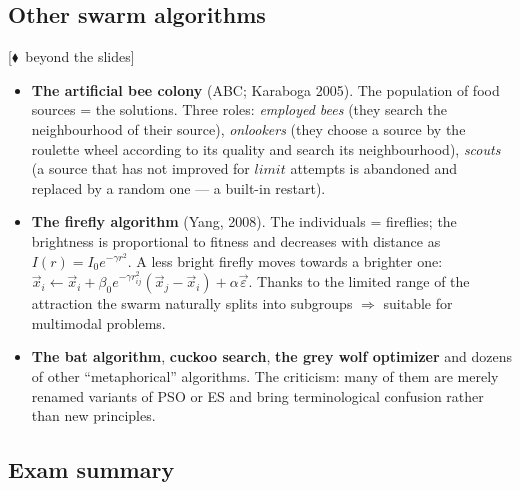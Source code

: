 \documentclass[11pt,a4paper]{article}
\theoremstyle{definition}
\providecommand{\uv}[1]{``#1''}
\newcommand{\mimo}{\textcolor{markcol}{\textsf{\footnotesize[$\blacklozenge$~beyond the slides]}}}
\begin{document}
\subsection{Other swarm algorithms}

\noindent\mimo{}

\begin{itemize}
\item \textbf{The artificial bee colony} (ABC; Karaboga 2005). The population of
  food sources = the solutions. Three roles:
  \emph{employed bees} (they search the neighbourhood of their source),
  \emph{onlookers} (they choose a source by the roulette wheel according to its
  quality and search its neighbourhood),
  \emph{scouts} (a source that has not improved for $limit$ attempts is
  abandoned and replaced by a random one --- a built-in restart).
\item \textbf{The firefly algorithm} (Yang, 2008). The individuals = fireflies;
  the brightness is proportional to fitness and decreases with distance as
  $I(r) = I_0 e^{-\gamma r^2}$. A less bright firefly moves towards a brighter
  one:
  $\vec x_i \gets \vec x_i + \beta_0 e^{-\gamma r_{ij}^2}(\vec x_j - \vec x_i)
  + \alpha \vec\varepsilon$. Thanks to the limited range of the attraction the
  swarm naturally splits into subgroups $\Rightarrow$ suitable for multimodal
  problems.
\item \textbf{The bat algorithm}, \textbf{cuckoo search}, \textbf{the grey wolf
  optimizer} and dozens of other \uv{metaphorical} algorithms. The criticism:
  many of them are merely renamed variants of PSO or ES and bring terminological
  confusion rather than new principles.
\end{itemize}

\subsection{Exam summary}
\end{document}
